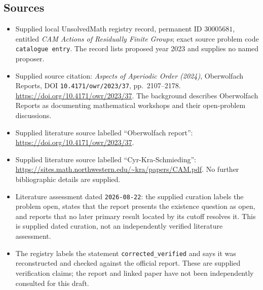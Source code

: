 \documentclass[11pt]{article}
\begin{document}
\subsection{Sources}
\begin{itemize}
\item Supplied local UnsolvedMath registry record, permanent ID \(30005681\), entitled \emph{CAM Actions of Residually Finite Groups}; exact source problem code \texttt{catalogue entry}. The record lists proposed year 2023 and supplies no named proposer.
\item Supplied source citation: \emph{Aspects of Aperiodic Order (2024)}, Oberwolfach Reports, DOI \texttt{10.4171/owr/2023/37}, pp.\ 2107--2178. \url{https://doi.org/10.4171/owr/2023/37}. The background describes Oberwolfach Reports as documenting mathematical workshops and their open-problem discussions.
\item Supplied literature source labelled ``Oberwolfach report'': \url{https://doi.org/10.4171/owr/2023/37}.
\item Supplied literature source labelled ``Cyr-Kra-Schmieding'': \url{https://sites.math.northwestern.edu/~kra/papers/CAM.pdf}. No further bibliographic details are supplied.
\item Literature assessment dated \texttt{2026-08-22}: the supplied curation labels the problem open, states that the report presents the existence question as open, and reports that no later primary result located by its cutoff resolves it. This is supplied dated curation, not an independently verified literature assessment.
\item The registry labels the statement \texttt{corrected\_verified} and says it was reconstructed and checked against the official report. These are supplied verification claims; the report and linked paper have not been independently consulted for this draft.
\end{itemize}
\end{document}

